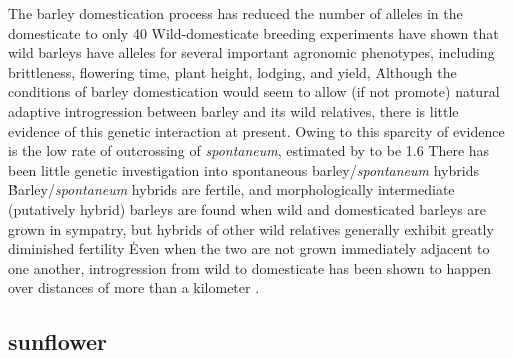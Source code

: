 \documentclass[11pt]{article}
\begin{document}
The barley domestication process has reduced the number of alleles in the domesticate to only 40%
Wild-domesticate breeding experiments have shown that wild barleys have alleles for several important agronomic phenotypes, including brittleness, flowering time, plant height, lodging, and yield,  \cite{von2006ab, handley1994chromosome}\.
Although the conditions of barley domestication would seem to allow (if not promote) natural adaptive introgression between barley and its wild relatives, there is little evidence of this genetic interaction at present.
Owing to this sparcity of evidence is the low rate of outcrossing of \emph{spontaneum}, estimated by \cite{brown1978outcrossing} to be 1.6%
There has been little genetic investigation into spontaneous barley/\emph{spontaneum} hybrids \cite{ellstrand2003dangerous}\.
Barley/\emph{spontaneum} hybrids are fertile, and morphologically intermediate (putatively hybrid) barleys are found when wild and domesticated barleys are grown in sympatry, but hybrids of other wild relatives generally exhibit greatly diminished fertility \cite{ellstrand2003dangerous, harlan1995living}\.
Even when the two are not grown immediately adjacent to one another, introgression from wild to domesticate has been shown to happen over distances of more than a kilometer \cite{hillman2001new}.















\subsection*{sunflower}
\end{document}

